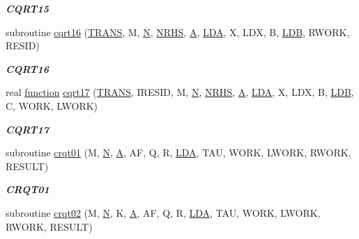 \begin{DoxyCompactItemize}
\begin{DoxyCompactList}\small\item\em {\bfseries C\+Q\+R\+T15} \end{DoxyCompactList}\item 
subroutine \hyperlink{group__complex__lin_ga411b1e00cca1e5aebf4548238911d155}{cqrt16} (\hyperlink{superlu__enum__consts_8h_a0c4e17b2d5cea33f9991ccc6a6678d62a1f61e3015bfe0f0c2c3fda4c5a0cdf58}{T\+R\+A\+N\+S}, M, \hyperlink{polmisc_8c_a0240ac851181b84ac374872dc5434ee4}{N}, \hyperlink{example__user_8c_aa0138da002ce2a90360df2f521eb3198}{N\+R\+H\+S}, \hyperlink{classA}{A}, \hyperlink{example__user_8c_ae946da542ce0db94dced19b2ecefd1aa}{L\+D\+A}, X, L\+D\+X, B, \hyperlink{example__user_8c_a50e90a7104df172b5a89a06c47fcca04}{L\+D\+B}, R\+W\+O\+R\+K, R\+E\+S\+I\+D)
\begin{DoxyCompactList}\small\item\em {\bfseries C\+Q\+R\+T16} \end{DoxyCompactList}\item 
real \hyperlink{afunc_8m_a7b5e596df91eadea6c537c0825e894a7}{function} \hyperlink{group__complex__lin_ga6f238748519170944745778beb81b386}{cqrt17} (\hyperlink{superlu__enum__consts_8h_a0c4e17b2d5cea33f9991ccc6a6678d62a1f61e3015bfe0f0c2c3fda4c5a0cdf58}{T\+R\+A\+N\+S}, I\+R\+E\+S\+I\+D, M, \hyperlink{polmisc_8c_a0240ac851181b84ac374872dc5434ee4}{N}, \hyperlink{example__user_8c_aa0138da002ce2a90360df2f521eb3198}{N\+R\+H\+S}, \hyperlink{classA}{A}, \hyperlink{example__user_8c_ae946da542ce0db94dced19b2ecefd1aa}{L\+D\+A}, X, L\+D\+X, B, \hyperlink{example__user_8c_a50e90a7104df172b5a89a06c47fcca04}{L\+D\+B}, C, W\+O\+R\+K, L\+W\+O\+R\+K)
\begin{DoxyCompactList}\small\item\em {\bfseries C\+Q\+R\+T17} \end{DoxyCompactList}\item 
subroutine \hyperlink{group__complex__lin_ga756b7a6d63caa37fef5404b1e71a7a7d}{crqt01} (M, \hyperlink{polmisc_8c_a0240ac851181b84ac374872dc5434ee4}{N}, \hyperlink{classA}{A}, A\+F, Q, R, \hyperlink{example__user_8c_ae946da542ce0db94dced19b2ecefd1aa}{L\+D\+A}, T\+A\+U, W\+O\+R\+K, L\+W\+O\+R\+K, R\+W\+O\+R\+K, R\+E\+S\+U\+L\+T)
\begin{DoxyCompactList}\small\item\em {\bfseries C\+R\+Q\+T01} \end{DoxyCompactList}\item 
subroutine \hyperlink{group__complex__lin_gab632d0ad24cf35d7dc17ca98ebca61fe}{crqt02} (M, \hyperlink{polmisc_8c_a0240ac851181b84ac374872dc5434ee4}{N}, K, \hyperlink{classA}{A}, A\+F, Q, R, \hyperlink{example__user_8c_ae946da542ce0db94dced19b2ecefd1aa}{L\+D\+A}, T\+A\+U, W\+O\+R\+K, L\+W\+O\+R\+K, R\+W\+O\+R\+K, R\+E\+S\+U\+L\+T)

\end{DoxyCompactItemize}
